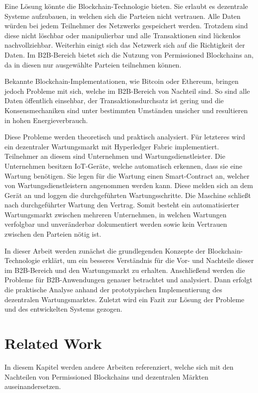 \documentclass{llncs}
\begin{document}
Eine Lösung könnte die Blockchain-Technologie bieten. Sie erlaubt es dezentrale Systeme aufzubauen, in welchen sich die Parteien nicht vertrauen. Alle Daten würden bei jedem Teilnehmer des Netzwerks gespeichert werden. Trotzdem sind diese nicht löschbar oder manipulierbar und alle Transaktionen sind lückenlos nachvollziehbar. Weiterhin einigt sich das Netzwerk sich auf die Richtigkeit der Daten. Im B2B-Bereich bietet sich die Nutzung von Permissioned Blockchains an, da in diesen nur ausgewählte Parteien teilnehmen können.

Bekannte Blockchain-Implementationen, wie Bitcoin oder Ethereum, bringen jedoch Probleme mit sich, welche im B2B-Bereich von Nachteil sind. So sind alle Daten öffentlich einsehbar, der Transaktionsdurchsatz ist gering und die Konsensmechaniken sind unter bestimmten Umständen unsicher und resultieren in hohen Energieverbrauch.

Diese Probleme werden theoretisch und praktisch analysiert. Für letzteres wird ein dezentraler Wartungsmarkt mit Hyperledger Fabric implementiert. Teilnehmer an diesem sind Unternehmen und Wartungsdienstleister. Die Unternehmen besitzen IoT-Geräte, welche automatisch erkennen, dass sie eine Wartung benötigen. Sie legen für die Wartung einen Smart-Contract an, welcher von Wartungsdienstleistern angenommen werden kann. Diese melden sich an dem Gerät an und loggen die durchgeführten Wartungsschritte. Die Maschine schließt nach durchgeführter Wartung den Vertrag. Somit besteht ein automatisierter Wartungsmarkt zwischen mehreren Unternehmen, in welchen Wartungen verfolgbar und unveränderbar dokumentiert werden sowie kein Vertrauen zwischen den Parteien nötig ist.

In dieser Arbeit werden zunächst die grundlegenden Konzepte der Blockchain-Technologie erklärt, um ein besseres Verständnis für die Vor- und Nachteile dieser im B2B-Bereich und den Wartungsmarkt zu erhalten. Anschließend werden die Probleme für B2B-Anwendungen genauer betrachtet und analysiert. Dann erfolgt die praktische Analyse anhand der prototypischen Implementierung des dezentralen Wartungsmarktes. Zuletzt wird ein Fazit zur Lösung der Probleme und des entwickelten Systems gezogen.

\section{Related Work}
In diesem Kapitel werden andere Arbeiten referenziert, welche sich mit den Nachteilen von Permissioned Blockchains und dezentralen Märkten auseinandersetzen.
\end{document}
